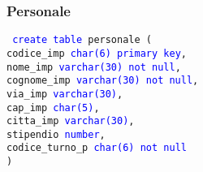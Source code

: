 \documentclass{article}
\begin{document}
    \subsubsection{Personale}
    \begin{flushleft}
        \texttt{
        \textcolor{blue}{create table} personale ( \\
        \hspace*{2em} codice\_imp \hspace*{4.7em} \textcolor{blue}{char(6)} \hspace*{9.4em} \textcolor{blue}{primary key}, \\
        \hspace*{2em} nome\_imp \hspace*{5.7em} \textcolor{blue}{varchar(30)} \hspace*{7.4em} \textcolor{blue}{not null}, \\
        \hspace*{2em} cognome\_imp \hspace*{4.3em} \textcolor{blue}{varchar(30)} \hspace*{7.3em} \textcolor{blue}{not null}, \\
        \hspace*{2em} via\_imp \hspace*{6.4em} \textcolor{blue}{varchar(30)}, \\
        \hspace*{2em} cap\_imp \hspace*{6.4em} \textcolor{blue}{char(5)}, \\
        \hspace*{2em} citta\_imp \hspace*{5.5em} \textcolor{blue}{varchar(30)}, \\
        \hspace*{2em} stipendio \hspace*{5.5em} \textcolor{blue}{number}, \\
        \hspace*{2em} codice\_turno\_p \hspace*{3.3em} \textcolor{blue}{char(6)} \hspace*{8.9em} \textcolor{blue}{not null} \\)}
    \end{flushleft}
\end{document}
